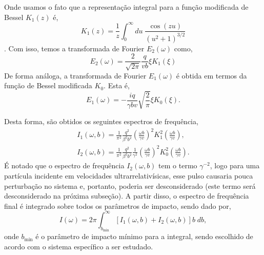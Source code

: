 Onde usamos o fato que a representação integral para a função modificada
de Bessel $K_1 (z)$ é,
\begin{equation}
	K_1 (z) = \frac{1}{z} \int _0 ^{\infty} du \; \frac{\cos (zu)}{(u^2 + 1)^{3/2}}
\end{equation}
\cite{arfken7ed}. Com isso, temos a transformada de Fourier $E_2 (\omega)$ como,
\begin{equation}
	E_2 (\omega) = \frac{2}{\sqrt{2\pi}} \frac{q}{vb} \xi K_1 (\xi)
\end{equation}
De forma análoga, a transformada de Fourier $E_1 (\omega)$ é obtida em termos da
função de Bessel modificada $K_0$. Esta é,
\begin{equation}
	E_1 (\omega) = -\frac{iq}{\gamma b v} \sqrt{\frac{2}{\pi}} \xi K_0 (\xi).
\end{equation}


Desta forma, são obtidos os seguintes espectros de frequência,
\begin{gather}
	I_1 (\omega , b) = \frac{1}{\pi ^2} \frac{q^2}{ \beta ^2 b^2}  \left(
	\frac{\omega b}{\gamma v} \right)^2 K_1 ^2 \left( \frac{\omega b}{\gamma v}
	\right), \\
	I_2 (\omega , b) = \frac{1}{\pi ^2} \frac{q^2}{\beta ^2 b^2 }
	\frac{1}{\gamma ^2} \left(\frac{\omega b}{\gamma v} \right)^2
		K_0 ^2 \left( \frac{\omega b}{\gamma v} \right).
\end{gather}
É notado que o espectro de frequência $I_2 (\omega , b)$ tem o termo $\gamma
^{-2}$, logo para uma partícula incidente em velocidades ultrarrelativísicas,
esse pulso causaria pouca perturbação no sistema e, portanto, poderia ser
desconsiderado (este termo será desconsiderado na próxima subseção).  A partir
disso, o espectro de frequência final é integrado sobre todos os parâmetros de
impacto, sendo dado por,
\begin{equation}
	I (\omega) = 2\pi \int _{b_\text{min}} ^\infty \left[ I_1
	(\omega , b) + I_2 (\omega , b)\right] b \; db,
\end{equation}
onde $b_\text{min}$ é o parâmetro de impacto mínimo para a integral, sendo
escolhido de acordo com o sistema específico a ser estudado.

